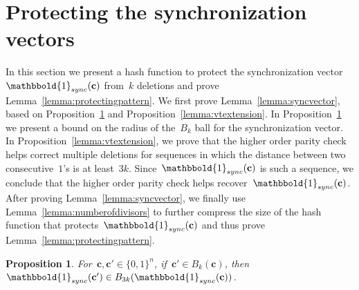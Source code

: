 \documentclass[10pt,a4paper,onecolumn]{IEEEtran}
\newtheorem{proposition}{Proposition}
\newcommand{\1}{\mathbbold{1}}
\newcommand{\boldc}{\mathbf{c}}
\newcommand{\boldm}{\mathbf{m}}
\begin{document}
\section{Protecting the synchronization vectors}\label{section:synchronizationvectors}
In this section we present a hash function to protect the synchronization vector~$\1_{sync}(\boldc)$ from~$k$ deletions and prove Lemma~\ref{lemma:protectingpattern}.
We first prove Lemma~\ref{lemma:syncvector},  based on Proposition~\ref{lemma:editdistance} and Proposition~\ref{lemma:vtextension}. In Proposition~\ref{lemma:editdistance} we present a bound on the radius of the~$B_k$ ball for the synchronization vector. In Proposition~\ref{lemma:vtextension}, we prove that the higher order parity check helps correct multiple deletions for sequences in which the distance between two consecutive~$1$'s is at least~$3k$. Since~$\1_{sync}(\boldc)$ is such a sequence, we conclude that the higher order parity check helps recover~$\1_{sync}(\boldc)$. After proving Lemma~\ref{lemma:syncvector}, we finally use Lemma~\ref{lemma:numberofdivisors} to further compress the size of the hash function that protects~$\1_{sync}(\boldc)$ and thus prove Lemma~\ref{lemma:protectingpattern}.
\begin{proposition}\label{lemma:editdistance}
For~$\boldc,\boldc'\in\{0,1\}^n$, if~$\boldc'\in B_k(\boldc)$, then~$\1_{sync}(\boldc')\in B_{3k}(\1_{sync}(\boldc))$.
\end{proposition}
\end{document}
